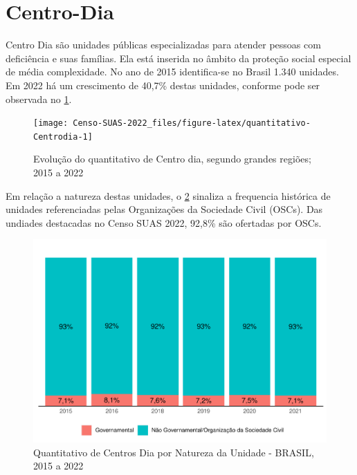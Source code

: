 \documentclass[
  brazilian]{report}
\begin{document}
\hypertarget{centro-dia}{%
\section{Centro-Dia}\label{centro-dia}}

Centro Dia são unidades públicas especializadas para atender pessoas com
deficiência e suas famílias. Ela está inserida no âmbito da proteção
social especial de média complexidade. No ano de 2015 identifica-se no
Brasil 1.340 unidades. Em 2022 há um crescimento de 40,7\% destas
unidades, conforme pode ser observada no
\cref{fig:quantitativo-Centrodia}.

\begin{figure}
\texttt{[image: Censo-SUAS-2022\_files/figure-latex/quantitativo-Centrodia-1]} \caption[Evolução do quantitativo de Centro dia, segundo grandes regiões]{Evolução do quantitativo de Centro dia, segundo grandes regiões; 2015 a 2022}\label{fig:quantitativo-Centrodia}
\end{figure}

Em relação a natureza destas unidades, o \cref{fig:cdia-natureza}
sinaliza a frequencia histórica de unidades referenciadas pelas
Organizações da Sociedade Civil (OSCs). Das undiades destacadas no Censo
SUAS 2022, 92,8\% são ofertadas por OSCs.

\begin{figure}
\includegraphics{Censo-SUAS-2022_files/figure-latex/cdia-natureza-1} \caption[Quantitativo de Centros Dia por Natureza da Unidade - BRASIL, 2015 a 2022]{Quantitativo de Centros Dia por Natureza da Unidade - BRASIL, 2015 a 2022}\label{fig:cdia-natureza}
\end{figure}
\end{document}
